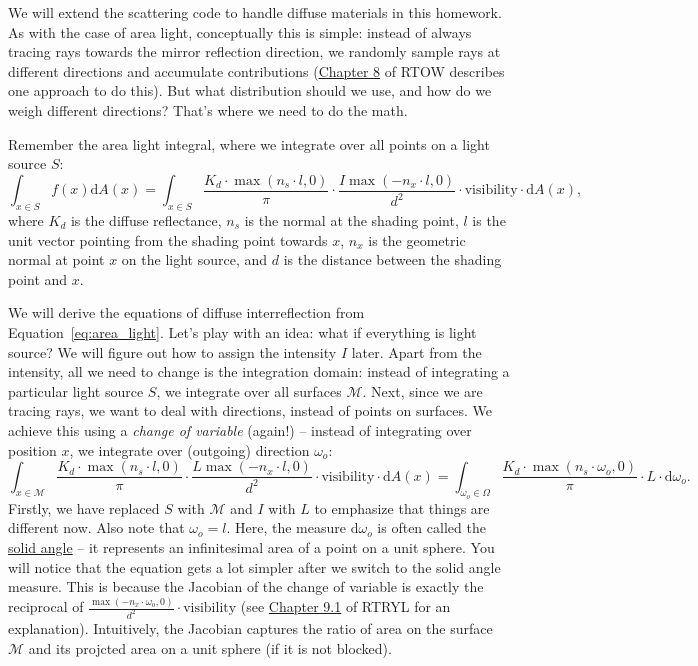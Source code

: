We will extend the scattering code to handle diffuse materials in this homework. As with the case of area light, conceptually this is simple: instead of always tracing rays towards the mirror reflection direction, we randomly sample rays at different directions and accumulate contributions (\href{https://raytracing.github.io/books/RayTracingInOneWeekend.html#diffusematerials}{Chapter 8} of RTOW describes one approach to do this). But what distribution should we use, and how do we weigh different directions? That's where we need to do the math.

Remember the area light integral, where we integrate over all points on a light source $S$:
\begin{equation}
\int_{x \in S} f(x) \mathrm{d}A(x) = \int_{x \in S} \frac{K_d \cdot \max\left(n_s \cdot l, 0\right)}{\pi} \cdot \frac{I \max\left(-n_x \cdot l, 0\right)}{d^2} \cdot \text{visibility} \cdot \mathrm{d}A(x),
\label{eq:area_light}
\end{equation}
where $K_d$ is the diffuse reflectance, $n_s$ is the normal at the shading point, $l$ is the unit vector pointing from the shading point towards $x$, $n_x$ is the geometric normal at point $x$ on the light source, and $d$ is the distance between the shading point and $x$.

We will derive the equations of diffuse interreflection from Equation~\eqref{eq:area_light}. Let's play with an idea: what if everything is light source? We will figure out how to assign the intensity $I$ later. Apart from the intensity, all we need to change is the integration domain: instead of integrating a particular light source $S$, we integrate over all surfaces $\mathcal{M}$. Next, since we are tracing rays, we want to deal with directions, instead of points on surfaces. We achieve this using a \emph{change of variable} (again!) -- instead of integrating over position $x$, we integrate over (outgoing) direction $\omega_o$:
\begin{equation}
\int_{x \in \mathcal{M}} \frac{K_d \cdot \max\left(n_s \cdot l, 0\right)}{\pi} \cdot \frac{L \max\left(-n_x \cdot l, 0\right)}{d^2} \cdot \text{visibility} \cdot \mathrm{d}A(x) = 
\int_{\omega_o \in \Omega} \frac{K_d \cdot \max\left(n_s \cdot \omega_o, 0\right)}{\pi} \cdot L \cdot \mathrm{d}\omega_o.
\label{eq:area_light_solid_angle}
\end{equation}
Firstly, we have replaced $S$ with $\mathcal{M}$ and $I$ with $L$ to emphasize that things are different now.
Also note that $\omega_o = l$.
Here, the measure $\mathrm{d}\omega_o$ is often called the \href{https://en.wikipedia.org/wiki/Solid_angle}{solid angle} -- it represents an infinitesimal area of a point on a unit sphere. You will notice that the equation gets a lot simpler after we switch to the solid angle measure. This is because the Jacobian of the change of variable is exactly the reciprocal of $\frac{\max\left(-n_x \cdot \omega_o, 0\right)}{d^2} \cdot \text{visibility}$ (see \href{https://raytracing.github.io/books/RayTracingTheRestOfYourLife.html#samplinglightsdirectly/gettingthepdfofalight}{Chapter 9.1} of RTRYL for an explanation). Intuitively, the Jacobian captures the ratio of area on the surface $\mathcal{M}$ and its projcted area on a unit sphere (if it is not blocked).

